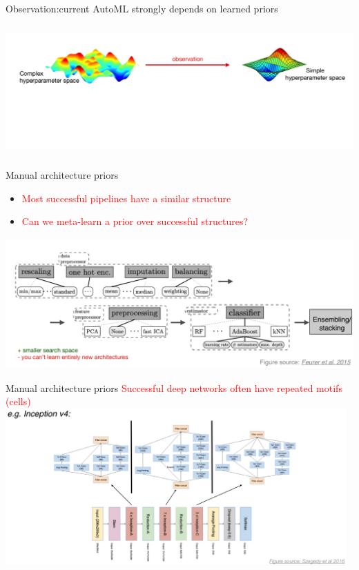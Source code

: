 \documentclass[aspectratio=169,t,handout,xcolor={usenames,dvipsnames}]{beamer}
\begin{document}
\begin{frame}{Observation:}{current AutoML strongly depends on learned priors}

\centering\includegraphics[height=5cm]{image/Jietu20220328-195740.jpg}

\end{frame}

\begin{frame}{Manual architecture priors}
\begin{itemize}
\item \textcolor{red}{Most successful pipelines have a similar structure}
\item \textcolor{red}{Can we meta-learn a prior over successful structures?} 
\end{itemize}


\centering\includegraphics[height=5cm]{image/Jietu20220328-200135.jpg}

\end{frame}

\begin{frame}{Manual architecture priors}
\textcolor{red}{Successful deep networks often have repeated motifs (cells)}
\centering\includegraphics[height=6cm]{image/Jietu20220328-200331.jpg}

\end{frame}
\end{document}
